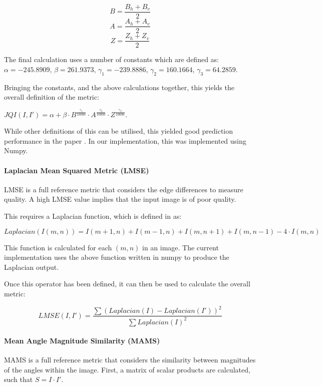 \documentclass[11pt,a4paper]{article}
\begin{document}
                $$B = \frac{B_h + B_v}{2}$$
                $$A = \frac{A_h + A_v}{2}$$
                $$Z = \frac{Z_h + Z_v}{2}$$

                The final calculation uses a number of constants which are defined as:
                $\alpha = -245.8909$, $\beta = 261.9373$, $\gamma_1 = -239.8886$, $\gamma_2 = 160.1664$, $\gamma_3 = 64.2859$.

                Bringing the constants, and the above calculations together, this yields the overall definition of the metric:

                $JQI(I, I') = \alpha + \beta \cdot B ^{\frac{\gamma_1}{10000}} \cdot A^{\frac{\gamma_2}{10000}} \cdot Z^{\frac{\gamma_3}{10000}}$.

                While other definitions of this can be utilised, this yielded good prediction performance in the paper \cite{JQIPaper}. In our implementation, this was implemented using 
                Numpy.
            \paragraph{Laplacian Mean Squared Metric (LMSE)}
                LMSE is a full reference metric that considers the edge differences to measure quality. A high LMSE value implies that the input image is of poor quality. 
                
                This requires a Laplacian function, which is defined in \cite{LMSEPaper} as:

                $$Laplacian(I(m, n)) = I(m+1, n) + I(m-1, n) + I(m, n+1) + I(m, n-1) - 4\cdot I(m, n)$$

                This function is calculated for each $(m, n)$ in an image. The current implementation uses the above function written in numpy to produce the Laplacian output. 
                \cite{LMSEPaper}

                Once this operator has been defined, it can then be used to calculate the overall metric: 

                $$LMSE(I, I') = \frac{\sum (Laplacian(I) - Laplacian(I'))^2}{\sum Laplacian(I)^2}$$
                
            \paragraph{Mean Angle Magnitude Similarity (MAMS)}
                MAMS is a full reference metric that considers the similarity between magnitudes of the angles within the image. First, a matrix of scalar products are calculated, such that $S=I \cdot I'$.
                
\end{document}
